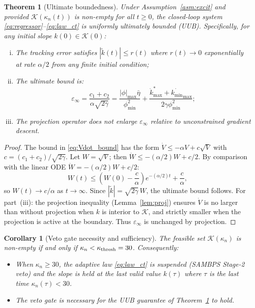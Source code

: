\documentclass[journal]{IEEEtran}
\newtheorem{theorem}{Theorem}
\newtheorem{corollary}{Corollary}
\newcommand{\kappan}{\kappa_{n}}
\newcommand{\ktilde}{\tilde{k}}
\newcommand{\kmin}{k_{\min}}
\newcommand{\calK}{\mathcal{K}}
\begin{document}
\begin{theorem}[Ultimate boundedness]
\label{thm:main}
Under Assumption~\ref{asm:excit} and provided $\calK(\kappan(t))$
is non-empty for all $t \geq 0$, the closed-loop system
\eqref{eq:regressor}--\eqref{eq:law_ct} is uniformly ultimately bounded
(UUB).  Specifically, for any initial slope $k(0) \in \calK(0)$:
\begin{enumerate}[(i)]
  \item The tracking error satisfies $|\ktilde(t)| \leq r(t)$ where
        $r(t) \to 0$ exponentially at rate $\alpha/2$ from any finite
        initial condition;
  \item The ultimate bound is:
        \begin{equation}
          \varepsilon_\infty =
            \frac{c_1 + c_2}{\alpha\sqrt{2\gamma}}
            = \frac{|\phi|_{\max}\bar{\eta}}{\phi^2_{\min}}
            + \frac{\dot{k}^*_{\max} + \dot{\kmin}_{\max}}{2\gamma\phi^2_{\min}};
          \label{eq:ult_bound}
        \end{equation}
  \item The projection operator does not enlarge $\varepsilon_\infty$
        relative to unconstrained gradient descent.
\end{enumerate}
\end{theorem}

\begin{proof}
The bound in \eqref{eq:Vdot_bound} has the form
$\dot{V} \leq -\alpha V + c\sqrt{V}$ with
$c = (c_1+c_2)/\sqrt{2\gamma}$.  Let $W = \sqrt{V}$; then
$\dot{W} \leq -(\alpha/2)W + c/2$.  By comparison with the
linear ODE $\dot{W} = -(\alpha/2)W + c/2$:
\begin{equation}
  W(t) \leq \left(W(0) - \frac{c}{\alpha}\right)e^{-(\alpha/2)t}
             + \frac{c}{\alpha},
\end{equation}
so $W(t) \to c/\alpha$ as $t \to \infty$.  Since
$|\ktilde| = \sqrt{2\gamma}\,W$, the ultimate bound follows.
For part~(iii): the projection inequality
(Lemma~\ref{lem:proj}) ensures $\dot{V}$ is no larger than
without projection when $k$ is interior to $\calK$, and
strictly smaller when the projection is active at the boundary.
Thus $\varepsilon_\infty$ is unchanged by projection.
\end{proof}

\begin{corollary}[Veto gate necessity and sufficiency]
\label{cor:gate}
The feasible set $\calK(\kappan)$ is non-empty if and only if
$\kappan < \kappa_{\rm thresh} = 30$.  Consequently:
\begin{itemize}
  \item When $\kappan \geq 30$, the adaptive law \eqref{eq:law_ct}
        is suspended (SAMBPS Stage-2 veto) and the slope is held
        at the last valid value $k(\tau)$ where $\tau$ is the last
        time $\kappan(\tau) < 30$.
  \item The veto gate is necessary for the UUB guarantee of
        Theorem~\ref{thm:main} to hold.
\end{itemize}
\end{corollary}
\end{document}
